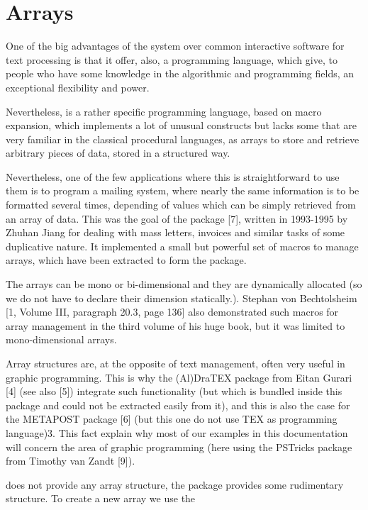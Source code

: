 \chapter{Arrays}

One of the big advantages of the \alltex system over common interactive software for text processing is that it offer,
also, a programming language, which give, to people who have some knowledge in the algorithmic and programming
fields, an exceptional flexibility and power.

Nevertheless, \tex is a rather specific programming language, based on macro expansion, which implements a lot of
unusual constructs but lacks some that are very familiar in the classical procedural languages, as arrays to store and
retrieve arbitrary pieces of data, stored in a structured way. 

Nevertheless, one of the few applications where this is straightforward to use them is to program a
mailing system, where nearly the same information is to be formatted several times, depending of values which can
be simply retrieved from an array of data. This was the goal of the  package [7], written in 1993-1995 by
Zhuhan Jiang for dealing with mass letters, invoices and similar tasks of some duplicative nature. It implemented a
small but powerful set of macros to manage arrays, which have been extracted to form the   package.

The arrays can be mono or bi-dimensional\cite{becht1993} and they are dynamically allocated (so we do not have to declare their
dimension statically.). Stephan von Bechtolsheim [1, Volume III, paragraph 20.3, page 136] also demonstrated such macros for array management in the third
volume of his huge book, but it was limited to mono-dimensional arrays. 

Array structures are, at the opposite of text management, often very useful in graphic programming. This is why
the (Al)DraTEX package from Eitan Gurari [4] (see also [5]) integrate such functionality (but which is bundled inside
this package and could not be extracted easily from it), and this is also the case for the METAPOST package [6] (but
this one do not use TEX as programming language)3. This fact explain why most of our examples in this documentation
will concern the area of graphic programming (here using the PSTricks package from Timothy van Zandt [9]).

\tex does not provide any array structure, the  package provides some rudimentary structure. To create a new array we use the 

